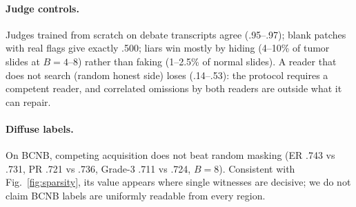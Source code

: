 \documentclass[10pt,twocolumn,letterpaper]{article}
\begin{document}
\paragraph{Judge controls.} Judges trained from scratch on debate transcripts agree (.95--.97); blank patches with real flags give exactly .500; liars win mostly by hiding (4--10\% of tumor slides at $B{=}4$--8) rather than faking (1--2.5\% of normal slides). A reader that does not search (random honest side) loses (.14--.53): the protocol requires a competent reader, and correlated omissions by both readers are outside what it can repair.

\paragraph{Diffuse labels.} On BCNB, competing acquisition does not beat random masking (ER .743 vs .731, PR .721 vs .736, Grade-3 .711 vs .724, $B{=}8$). Consistent with Fig.~\ref{fig:sparsity}, its value appears where single witnesses are decisive; we do not claim BCNB labels are uniformly readable from every region.
\end{document}
